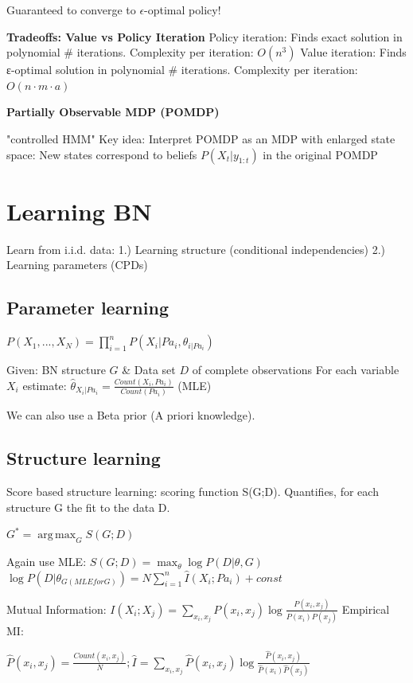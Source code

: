 \documentclass[a4paper, 11pt, landscape]{article}
\DeclareMathOperator*{\argmax}{arg\,max}
\begin{document}
\begin{multicols*}{3}
Guaranteed to converge to $\epsilon$-optimal policy!

\textbf{Tradeoffs: Value vs Policy Iteration}
Policy iteration: Finds exact solution in polynomial \# iterations. Complexity per iteration: $O(n^3)$
Value iteration: Finds ε-optimal solution in polynomial \# iterations. Complexity per iteration: $O(n\cdot m \cdot a)$

\textbf{Partially Observable MDP (POMDP)}

"controlled HMM"
Key idea: Interpret POMDP as an MDP with enlarged state space: New states correspond to beliefs $P(X_t | y_{1:t})$ in the original POMDP

\section{Learning BN}
Learn from i.i.d. data: 1.) Learning structure (conditional independencies) 2.) Learning parameters (CPDs)

\subsection{Parameter learning} 

$P(X_1, ..., X_N) = \prod_{i=1}^{n} P(X_i | Pa_i, {\theta}_{i | Pa_i})$

Given:  BN structure $G$ \& Data set $D$ of complete observations
For each variable $X_i$ estimate: $\hat{\theta}_{X_i | Pa_i} = \frac{Count(X_i , Pa_i)}{Count(Pa_i)}$ (MLE)

We can also use a Beta prior (A priori knowledge).

\subsection{Structure learning}

Score based structure learning: scoring function S(G;D). Quantifies, for each structure G the fit to the data D. 

$G^* = \argmax_G S(G;D)$

Again use MLE: $S(G;D) = \max_\theta \log P(D | \theta, G)$
$\log P(D | \theta_{G (MLE for G)}) = N \sum_{i=1}^{n} \hat{I}(X_i ; Pa_i) + const$

Mutual Information: $I(X_i; X_j) = \sum_{x_i, x_j} P(x_i, x_j) \log \frac{P(x_i, x_j)}{P(x_i) P(x_j)}$
Empirical MI: 

$\hat{P}(x_i, x_j) = \frac{Count(x_i, x_j)}{N}; \hat{I} = \sum_{x_i, x_j} \hat{P}(x_i, x_j) \log \frac{\hat{P}(x_i, x_j)}{\hat{P}(x_i) \hat{P}(x_j)}$


\end{multicols*}
\end{document}
